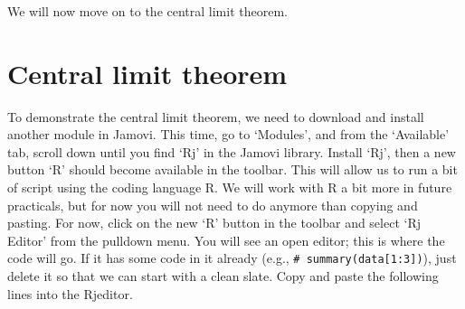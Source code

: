 \documentclass[
]{scrbook}
\begin{document}
\begin{verbatim}






\end{verbatim}

We will now move on to the central limit theorem.

\hypertarget{central-limit-theorem}{%
\section{Central limit theorem}\label{central-limit-theorem}}

To demonstrate the central limit theorem, we need to download and install another module in Jamovi.
This time, go to `Modules', and from the `Available' tab, scroll down until you find `Rj' in the Jamovi library.
Install `Rj', then a new button `R' should become available in the toolbar.
This will allow us to run a bit of script using the coding language R.
We will work with R a bit more in future practicals, but for now you will not need to do anymore than copying and pasting.
For now, click on the new `R' button in the toolbar and select `Rj Editor' from the pulldown menu.
You will see an open editor; this is where the code will go.
If it has some code in it already (e.g., \texttt{\#\ summary(data{[}1:3{]})}), just delete it so that we can start with a clean slate.
Copy and paste the following lines into the Rjeditor.
\end{document}

